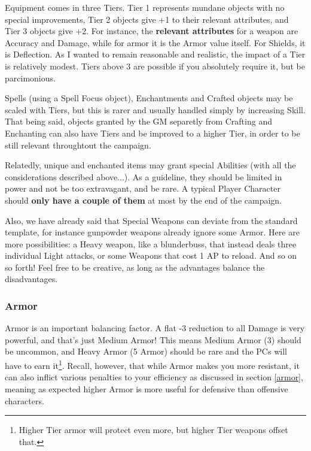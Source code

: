\label{balancing_equipment}

Equipment comes in three Tiers. Tier 1 represents mundane objects with no special improvements, Tier 2 objects give +1 to their relevant attributes, and Tier 3 objects give +2. For instance, the \textbf{relevant attributes} for a weapon are Accuracy and Damage, while for armor it is the Armor value itself. For Shields, it is Deflection. As I wanted to remain reasonable and realistic, the impact of a Tier is relatively modest. Tiers above 3 are possible if you absolutely require it, but be parcimonious.

Spells (using a Spell Focus object), Enchantments and Crafted objects may be scaled with Tiers, but this is rarer and usually handled simply by increasing Skill. That being said, objects granted by the GM separetly from Crafting and Enchanting can also have Tiers and be improved to a higher Tier, in order to be still relevant throughtout the campaign.

Relatedly, unique and enchanted items may grant special Abilities (with all the considerations described above...). As a guideline, they should be limited in power and not be too extravagant, and be rare. A typical Player Character should \textbf{only have a couple of them} at most by the end of the campaign.

Also, we have already said that Special Weapons can deviate from the standard template, for instance gunpowder weapons already ignore some Armor. Here are more possibilities: a Heavy weapon, like a blunderbuss, that instead deals three individual Light attacks, or some Weapons that cost 1 AP to reload. And so on so forth! Feel free to be creative, as long as the advantages balance the disadvantages.


\subsubsection{Armor}

Armor is an important balancing factor. A flat -3 reduction to all Damage is very powerful, and that's just Medium Armor! This means Medium Armor (3) should be uncommon, and Heavy Armor (5 Armor) should be rare and the PCs will have to earn it\footnote{Higher Tier armor will protect even more, but higher Tier weapons offset that.}. Recall, however, that while Armor makes you more resistant, it can also inflict various penalties to your efficiency as discussed in section \ref{armor}, meaning as expected higher Armor is more useful for defensive than offensive characters.

